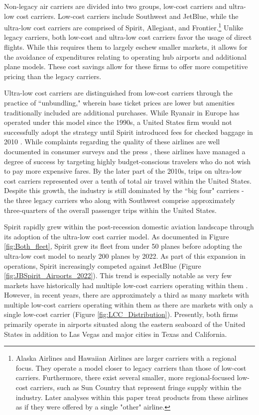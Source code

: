 \documentclass{article}
\begin{document}
	Non-legacy air carriers are divided into two groups, low-cost carriers and ultra-low cost carriers. Low-cost carriers include Southwest and JetBlue, while the ultra-low cost carriers are comprised of Spirit, Allegiant, and Frontier.\footnote{Alaska Airlines and Hawaiian Airlines are larger carriers with a regional focus. They operate a model closer to legacy carriers than those of low-cost carriers. Furthermore, there exist several smaller, more regional-focused low-cost carriers, such as Sun Country that represent fringe supply within the industry. Later analyses within this paper treat products from these airlines as if they were offered by a single "other" airline.} Unlike legacy carriers, both low-cost and ultra-low cost carriers favor the usage of direct flights. While this requires them to largely eschew smaller markets, it allows for the avoidance of expenditures relating to operating hub airports and additional plane models. These cost savings allow for these firms to offer more competitive pricing than the legacy carriers. %

	Ultra-low cost carriers are distinguished from low-cost carriers through the practice of ``unbundling," wherein base ticket prices are lower but amenities traditionally included are additional purchases. While Ryanair in Europe has operated under this model since the 1990s, a United States firm would not successfully adopt the strategy until Spirit introduced fees for checked baggage in 2010 \citep{bachwich_emergence_2017}. While complaints regarding the quality of these airlines are well documented in consumer surveys and the press \citep{vasel_spirit_2016, elliott_jetblue_2022}, these airlines have managed a degree of success by targeting highly budget-conscious travelers who do not wish to pay more expensive fares. By the later part of the 2010s, trips on ultra-low cost carriers represented over a tenth of total air travel within the United States.  Despite this growth, the industry is still dominated by the ``big four" carriers - the three legacy carriers who along with Southwest comprise approximately three-quarters of the overall passenger trips within the United States. 

    Spirit rapidly grew within the post-recession domestic aviation landscape through its adoption of the ultra-low cost carrier model. As documented in Figure \ref{fig:Both_fleet}, Spirit grew its fleet from under 50 planes before adopting the ultra-low cost model to nearly 200 planes by 2022. As part of this expansion in operations, Spirit increasingly competed against JetBlue (Figure \ref{fig:JBSpirit_Airports_2022}). This trend is especially notable as very few markets have historically had multiple low-cost carriers operating within them \citep{kwoka_fringe_2016, ciliberto_market_2021}. However, in recent years, there are approximately a third as many markets with multiple low-cost carriers operating within them as there are markets with only a single low-cost carrier (Figure \ref{fig:LCC_Distribution}). Presently, both firms primarily operate in airports situated along the eastern seaboard of the United States in addition to Las Vegas and major cities in Texas and California.
\end{document}

